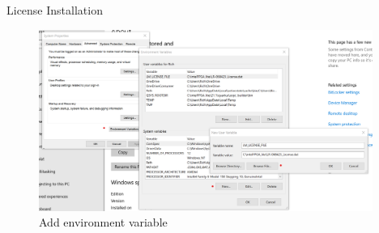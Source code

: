 \documentclass[fleqn]{beamer}
\begin{document}
\begin{frame}{License Installation}
    \begin{figure}
        \centering
        \includegraphics[height=16em]{figures/envvars.png}
        \caption{Add environment variable}
        \label{fig:my_label}
    \end{figure}
\end{frame}
\end{document}
